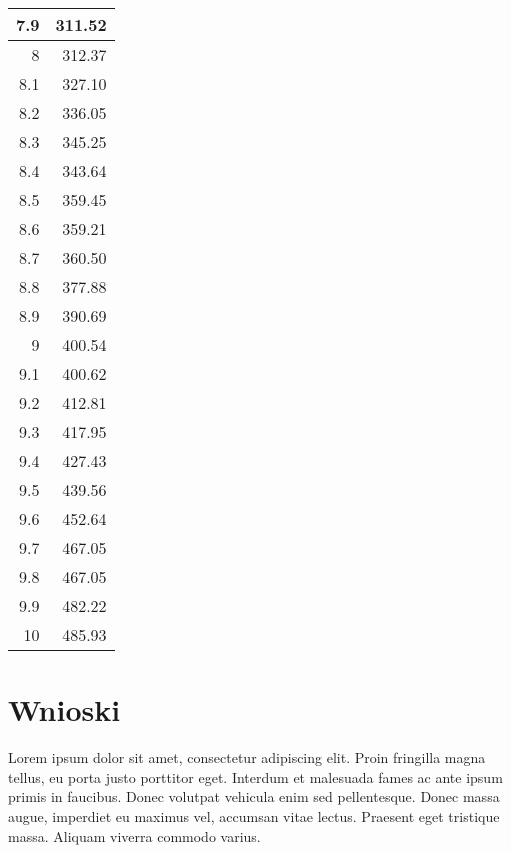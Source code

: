 \documentclass{article}
\begin{document}
\begin{center}
\begin{longtable}{|r|r|}
7.9 &311.52 \\ \hline
8 &312.37 \\ \hline
8.1 &327.10 \\ \hline
8.2 &336.05 \\ \hline
8.3 &345.25 \\ \hline
8.4 &343.64 \\ \hline
8.5 &359.45 \\ \hline
8.6 &359.21 \\ \hline
8.7 &360.50 \\ \hline
8.8 &377.88 \\ \hline
8.9 &390.69 \\ \hline
9 &400.54 \\ \hline
9.1 &400.62 \\ \hline
9.2 &412.81 \\ \hline
9.3 &417.95 \\ \hline
9.4 &427.43 \\ \hline
9.5 &439.56 \\ \hline
9.6 &452.64 \\ \hline
9.7 &467.05 \\ \hline
9.8 &467.05 \\ \hline
9.9 &482.22 \\ \hline
10 &485.93  \\ \hline


\end{longtable}
\end{center}

\begin{center}
\end{center}

\section{Wnioski}

Lorem ipsum dolor sit amet, consectetur adipiscing elit. Proin fringilla magna tellus, eu porta justo porttitor eget. Interdum et malesuada fames ac ante ipsum primis in faucibus. Donec volutpat vehicula enim sed pellentesque. Donec massa augue, imperdiet eu maximus vel, accumsan vitae lectus. Praesent eget tristique massa. Aliquam viverra commodo varius. 

\tableofcontents
\hypersetup{linktocpage}
\end{document}
